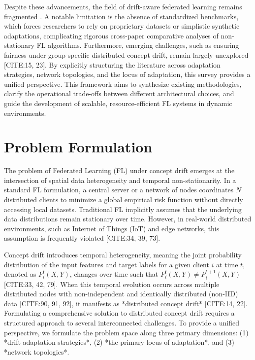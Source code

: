 \documentclass[journal]{IEEEtran}
\begin{document}
Despite these advancements, the field of drift-aware federated learning remains fragmented \cite{Mahdi2025}. A notable limitation is the absence of standardized benchmarks, which forces researchers to rely on proprietary datasets or simplistic synthetic adaptations, complicating rigorous cross-paper comparative analyses of non-stationary FL algorithms. Furthermore, emerging challenges, such as ensuring fairness under group-specific distributed concept drift, remain largely unexplored [CITE:15, 23]. By explicitly structuring the literature across adaptation strategies, network topologies, and the locus of adaptation, this survey provides a unified perspective. This framework aims to synthesize existing methodologies, clarify the operational trade-offs between different architectural choices, and guide the development of scalable, resource-efficient FL systems in dynamic environments.

\section{Problem Formulation}
\label{sec:problem_formulation}

The problem of Federated Learning (FL) under concept drift emerges at the intersection of spatial data heterogeneity and temporal non-stationarity. In a standard FL formulation, a central server or a network of nodes coordinates $N$ distributed clients to minimize a global empirical risk function without directly accessing local datasets. Traditional FL implicitly assumes that the underlying data distributions remain stationary over time. However, in real-world distributed environments, such as Internet of Things (IoT) and edge networks, this assumption is frequently violated [CITE:34, 39, 73]. 

Concept drift introduces temporal heterogeneity, meaning the joint probability distribution of the input features and target labels for a given client $i$ at time $t$, denoted as $P_i^t(X, Y)$, changes over time such that $P_i^t(X, Y) \neq P_i^{t+1}(X, Y)$ [CITE:33, 42, 79]. When this temporal evolution occurs across multiple distributed nodes with non-independent and identically distributed (non-IID) data [CITE:90, 91, 92], it manifests as *distributed concept drift* [CITE:14, 22]. Formulating a comprehensive solution to distributed concept drift requires a structured approach to several interconnected challenges. To provide a unified perspective, we formulate the problem space along three primary dimensions: (1) *drift adaptation strategies*, (2) *the primary locus of adaptation*, and (3) *network topologies*.
\end{document}
